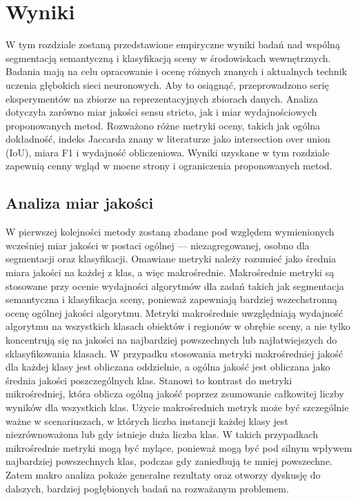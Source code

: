 \clearpage
\newpage %

\section{Wyniki}

W tym rozdziale zostaną przedstawione empiryczne wyniki badań nad wspólną segmentacją semantyczną i klasyfikacją sceny w środowiskach wewnętrznych. Badania mają na celu opracowanie i ocenę różnych znanych i aktualnych technik uczenia głębokich sieci neuronowych. Aby to osiągnąć, przeprowadzono serię eksperymentów na zbiorze na reprezentacyjnych zbiorach danych. Analiza dotyczyła zarówno miar jakości sensu stricto, jak i miar wydajnościowych proponowanych metod. Rozważono różne metryki oceny, takich jak ogólna dokładność, indeks Jaccarda znany w literaturze jako intersection over union (IoU), miara F1 i wydajność obliczeniowa. Wyniki uzyskane w tym rozdziale zapewnią cenny wgląd w mocne strony i ograniczenia proponowanych metod.

\subsection{Analiza miar jakości}
W pierwszej kolejności metody zostaną zbadane pod względem wymienionych wcześniej miar jakości w postaci ogólnej — niezagregowanej, osobno dla segmentacji oraz klasyfikacji. Omawiane metryki należy rozumieć jako średnia miara jakości na każdej z klas, a więc makrośrednie. Makrośrednie metryki są stosowane przy ocenie wydajności algorytmów dla zadań takich jak segmentacja semantyczna i klasyfikacja sceny, ponieważ zapewniają bardziej wszechstronną ocenę ogólnej jakości algorytmu. Metryki makrośrednie uwzględniają wydajność algorytmu na wszystkich klasach obiektów i regionów w obrębie sceny, a nie tylko koncentrują się na jakości na najbardziej powszechnych lub najłatwiejszych do sklasyfikowania klasach. W przypadku stosowania metryki makrośredniej jakość dla każdej klasy jest obliczana oddzielnie, a ogólna jakość jest obliczana jako średnia jakości poszczególnych klas. Stanowi to kontrast do metryki mikrośredniej, która oblicza ogólną jakość poprzez zsumowanie całkowitej liczby wyników dla wszystkich klas.
Użycie makrośrednich metryk może być szczególnie ważne w scenariuszach, w których liczba instancji każdej klasy jest niezrównoważona lub gdy istnieje duża liczba klas. W takich przypadkach mikrośrednie metryki mogą być mylące, ponieważ mogą być pod silnym wpływem najbardziej powszechnych klas, podczas gdy zaniedbują te mniej powszechne. Zatem makro analiza pokaże generalne rezultaty oraz otworzy dyskusję do dalszych, bardziej pogłębionych badań na rozważanym problemem.

